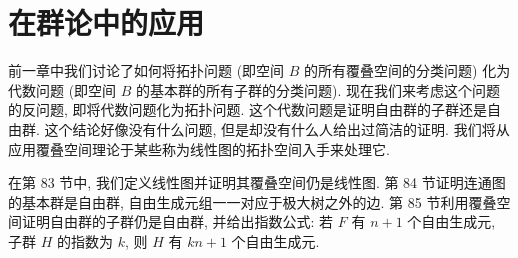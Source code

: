 \chapter{在群论中的应用}
\label{chapter:ch14}

前一章中我们讨论了如何将拓扑问题 (即空间 $B$ 的所有覆叠空间的分类问题) 化为代数问题 (即空间 $B$ 的基本群的所有子群的分类问题). 现在我们来考虑这个问题的反问题, 即将代数问题化为拓扑问题. 这个代数问题是证明自由群的子群还是自由群. 这个结论好像没有什么问题, 但是却没有什么人给出过简洁的证明. 我们将从应用覆叠空间理论于某些称为线性图的拓扑空间入手来处理它.

在第 83 节中, 我们定义线性图并证明其覆叠空间仍是线性图. 第 84 节证明连通图的基本群是自由群, 自由生成元组一一对应于极大树之外的边. 第 85 节利用覆叠空间证明自由群的子群仍是自由群, 并给出指数公式: 若 $F$ 有 $n+1$ 个自由生成元, 子群 $H$ 的指数为 $k$, 则 $H$ 有 $kn+1$ 个自由生成元.




